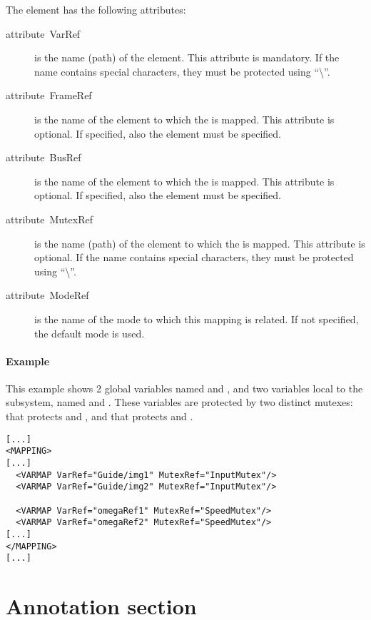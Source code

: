 The  element has the following attributes:
\begin{description}
\item [{attribute~VarRef}] is the name (path) of the 
  element.  This attribute is mandatory. If the  name
  contains special characters, they must be protected using
  {}``\textbackslash{}''.
\item [{attribute~FrameRef}] is the name of the  element
  to which the  is mapped. This attribute is optional. If
  specified, also the  element must be specified.
\item [{attribute~BusRef}] is the name of the  element to
  which the  is mapped. This attribute is optional. If
  specified, also the  element must be specified.
\item [{attribute~MutexRef}] is the name (path) of the 
  element to which the  is mapped. This attribute is
  optional.  If the  name contains special characters,
  they must be protected using {}``\textbackslash{}''.
\item [{attribute~ModeRef}] is the name of the mode to which this
  mapping is related. If not specified, the default mode is used.
\end{description}

\paragraph{Example}

This example shows 2 global variables named  and
, and two variables local to the 
subsystem, named  and . These variables are
protected by two distinct mutexes:  that protects
 and , and  that protects
 and .

\begin{lstlisting}
[...]
<MAPPING>
[...]
  <VARMAP VarRef="Guide/img1" MutexRef="InputMutex"/>
  <VARMAP VarRef="Guide/img2" MutexRef="InputMutex"/>

  <VARMAP VarRef="omegaRef1" MutexRef="SpeedMutex"/>
  <VARMAP VarRef="omegaRef2" MutexRef="SpeedMutex"/> 
[...]
</MAPPING>
[...]
\end{lstlisting}



\section{Annotation section}
\label{sec:Annotation-section}


